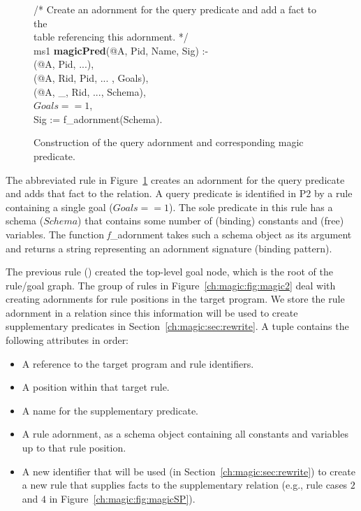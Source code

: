 \begin{figure}[!t]
\ssp
\centering
\begin{boxedminipage}{\linewidth}

/* Create an adornment for the query predicate and add a fact to the \\
 table referencing this adornment. */ \\
ms1 {\bf magicPred}(@A, Pid, Name, Sig) :- \\
(@A, Pid, ...), \\
(@A, Rid, Pid, ... , Goals), \\
(@A, \_, Rid, ..., Schema), \\
\datalogspace $Goals == 1$, \\
\datalogspace Sig := f\_adornment(Schema).
	
\end{boxedminipage}
\caption{\label{ch:magic:fig:magic1}Construction of the query adornment and corresponding magic predicate.}
\end{figure}

The abbreviated rule in Figure~\ref{ch:magic:fig:magic1} creates an adornment
for the query predicate and adds that fact to the  relation.  A
query predicate is identified in P2 by a rule containing a single goal ($Goals
== 1$).  The sole predicate in this rule has a schema ($Schema$) that contains
some number of (binding) constants and (free) variables.  The function {\emph
f\_adornment} takes such a schema object as its argument and returns a string
representing an adornment signature (binding pattern).

The previous rule () created the top-level goal node, which is the root
of the rule/goal graph.  The group of rules in Figure~\ref{ch:magic:fig:magic2}
deal with creating adornments for rule positions in the target program.  We
store the rule adornment in a  relation since this information will be
used to create supplementary predicates in Section~\ref{ch:magic:sec:rewrite}.
A  tuple contains the following attributes in order:
\begin{itemize}
   \ssp
  \item A reference to the target program and rule identifiers. 
  \item A position within that target rule.
  \item A name for the supplementary predicate.
  \item A rule adornment, as a schema object containing all constants and variables up to that rule position.
  \item A new identifier that will be used (in Section~\ref{ch:magic:sec:rewrite}) to create 
    a new rule that supplies facts to the supplementary relation (e.g., rule cases $2$ and $4$ 
    in Figure~\ref{ch:magic:fig:magicSP}).
\end{itemize}

